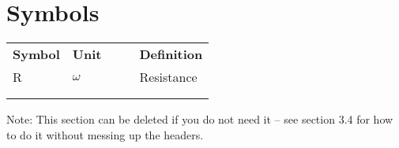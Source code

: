 \chapter{Symbols}

\begin{table}[h]
\centering
\begin{tabular}{lllll}
\textbf{Symbol} & \textbf{Unit} &  &  & \textbf{Definition} \\
R               & $\omega$      &  &  & Resistance          \\
                &               &  &  &                     \\
                &               &  &  &                    
\end{tabular}
\end{table}

Note: This section can be deleted if you do not need it – see section 3.4 for how to do it without messing up the headers.